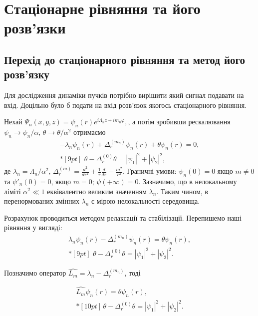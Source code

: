 \newpage
{}
\section{Стаціонарне рівняння та його розв'язки}
\subsection{Перехід до стаціонарного рівняння та метод його розв'язку}
\hspace*{8mm} Для дослідження динаміки пучків потрібно вирішити який сигнал подавати на вхід. Доцільно було б подати на вхід розв'язок якогось стаціонарного рівняння.

Нехай $\Psi_n(x,y,z)=\psi_n(r)e^{i\Lambda_n z+im_n\varphi},$, а потім зробивши рескалювання $\psi_n\to\psi_n/\alpha$, $\theta\to\theta/\alpha^2$ отримаємо
\begin{equation}
   \begin{array}{l} {\displaystyle
       -\lambda_n \psi_n(r)+\Delta_r^{(m_n)}\psi_n(r) +\theta\psi_n(r)=0,
       } \\*[9pt] {\displaystyle
\,\,\theta-\Delta_r^{(0)}\theta=|\psi_1|^2+|\psi_2|^2,
   }\end{array}
   \label{eq:StatNLS}
\end{equation}
де  $\lambda_n=\Lambda_n/\alpha^2$,
$\Delta_r^{(m)}=\frac{d^2}{dr^2}+\frac{1}{r}\frac{d}{dr}-\frac{m^2}{r^2}$.
Граничні умови: $\psi_n(0)=0$ якщо $m\ne0$ та $\psi'_n(0)=0$, якщо $m=0$; $\psi(+\infty)=0$. Зазначимо, що в нелокальному ліміті $\alpha^2\ll 1$ еквівалентно великим значенням $\lambda_n$. Таким чином, в перенормованих змінних $\lambda_n$ є мірою нелокальності середовища.

Розрахунок проводиться методом релаксації та стабілізації. Перепишемо наші рівняння у вигляді:
\begin{equation}
   \begin{array}{l} {\displaystyle
       \lambda_n \psi_n(r)-\Delta_r^{(m_n)}\psi_n(r)=\theta\psi_n(r),
       } \\*[9pt] {\displaystyle
\,\,\theta-\Delta_r^{(0)}\theta=|\psi_1|^2+|\psi_2|^2.
   }\end{array}
   \label{eq:StatNLS1}
\end{equation}

Позначимо оператор $\hat{L_m}=\lambda_n-\Delta_r^{(m_n)}$, тоді

\begin{equation}
   \begin{array}{l} {\displaystyle
       \hat{L_m} \psi_n(r)=\theta\psi_n(r),
       } \\*[10pt] {\displaystyle
\,\theta-\Delta_r^{(0)}\theta=|\psi_1|^2+|\psi_2|^2.
   }\end{array}
   \label{eq:StatNLS2}
\end{equation}

